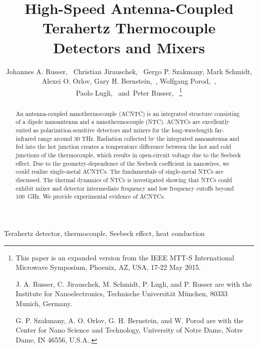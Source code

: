 \documentclass[journal]{IEEEtran}
\begin{document}
\title{\LARGE High-Speed Antenna-Coupled Terahertz Thermocouple \\ Detectors and Mixers}
\author{Johannes A. Russer,~
        Christian Jirauschek,~ Gergo P. Szakmany, Mark Schmidt,\\ Alexei O. Orlov, Gary H. Bernstein,~,  Wolfgang Porod,~, \\ Paolo Lugli,~
        and~Peter Russer,~
\thanks{

This paper is an expanded version from the IEEE MTT-S International Microwave Symposium, Phoenix, AZ, USA, 17-22 May 2015.

J. A. Russer, C. Jirauschek, M. Schmidt, P. Lugli, and P. Russer are with the Institute for Nanoelectronics, Technische Universit\"at M\"unchen, 80333 Munich, Germany.

G. P. Szakmany, A. O. Orlov, G. H. Bernstein, and  W. Porod are with the Center for Nano Science and Technology, University of Notre Dame, Notre Dame, IN
46556, U.S.A..

}}

\maketitle

\begin{abstract}
An antenna-coupled nanothermocouple (ACNTC) is an integrated structure consisting of a dipole nanoantenna and a nanothermocouple (NTC). ACNTCs are excellently suited as polarization-sensitive detectors and mixers for the long-wavelength far-infrared range around 30 THz. Radiation collected by the integrated nanoantenna and fed into the hot junction creates a temperature difference between the hot and cold junctions of the thermocouple, which results in  open-circuit voltage due to the Seebeck effect.  Due to the geometry-dependence of the Seebeck coefficient in nanowires, we could realize single-metal ACNTCs. The fundamentals of single-metal NTCs are discussed.  The thermal dynamics of NTCs is investigated showing that NTCs could exhibit mixer and detector intermediate frequency and low frequency cutoffs beyond 100~GHz. We provide  experimental evidence of ACNTCs.
\end{abstract}
\IEEEoverridecommandlockouts
\begin{keywords}
Terahertz detector, thermocouple, Seebeck effect, heat conduction
\end{keywords}
\IEEEpeerreviewmaketitle
%
%
\end{document}
